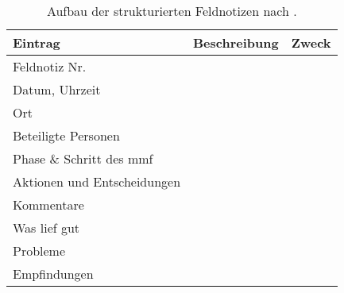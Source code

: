 \begin{table}[!h]
  \centering
  \begin{tabular}{l m{5cm} m{3cm} }
    \toprule
    \textbf{Eintrag} & \textbf{Beschreibung} & \textbf{Zweck} \\ \midrule
    Feldnotiz Nr. &  &  \\ \hline
	Datum, Uhrzeit &  &  \\ \hline
	Ort	 &  &  \\ \hline
	Beteiligte Personen	 &  &  \\ \hline
	Phase \& Schritt des \gls{mmf} &  &  \\ \hline
	Aktionen und Entscheidungen &  &  \\ \hline
	Kommentare &  &  \\ \hline
	Was lief gut &  &  \\ \hline
	Probleme &  &  \\ \hline
	Empfindungen &  &  \\
    \bottomrule
  \end{tabular}
  \caption[Aufbau der strukturierten Feldnotizen nach ]{
  	Aufbau der strukturierten Feldnotizen nach .
  }
  \label{tab:field-notes}
\end{table}

